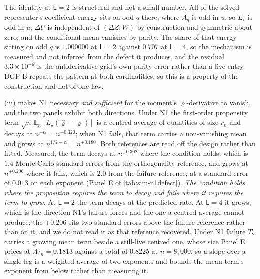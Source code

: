 \documentclass[
  12pt]{article}
\newcommand{\1}[1]{\mathds{1}\left[#1\right]}
\theoremstyle{plain}
\theoremstyle{definition}
\theoremstyle{definition}
\theoremstyle{remark}
\begin{document}
The identity at $\mathsf L=2$ is structural and not a small number. All of the
solved representer's coefficient energy sits on odd $q$ there, where $A_q$ is odd
in $u$, so $L_\star$ is odd in $u$; $\Delta U$ is independent of $(\Delta Z,W)$
by construction and symmetric about zero; and the conditional mean vanishes by
parity. The share of that energy sitting on odd $q$ is $1.000000$ at
$\mathsf L=2$ against $0.707$ at $\mathsf L=4$, so the mechanism is measured and
not inferred from the defect it produces, and the residual $3.3\times10^{-6}$ is
the antiderivative grid's own parity error rather than a live entry. DGP-B
repeats the pattern at both cardinalities, so this is a property of the
construction and not of one law.

(iii) makes N1 necessary \emph{and sufficient} for the moment's
$\varrho$-derivative to vanish, and the two panels exhibit both directions. Under
N1 the first-order propensity term
$\sqrt n\,\mathbb E_n[L_\star(\hat\varrho-\varrho)]$ is a centred average of
quantities of size $r_n$ and decays at $n^{-\alpha}=n^{-0.320}$; when N1 fails,
that term carries a non-vanishing mean and grows at $n^{1/2-\alpha}=n^{+0.180}$.
Both references are read off the design rather than fitted. Measured, the term
decays at $n^{-0.302}$ where the condition holds, which is $1.4$ Monte Carlo
standard errors from the orthogonality reference, and grows at $n^{+0.206}$ where
it fails, which is $2.0$ from the failure reference, at a standard error of
$0.013$ on each exponent (Panel E of \cref{tab:sim-n1defect}). \emph{The condition
holds where the proposition requires the term to decay and fails where it
requires the term to grow.} At $\mathsf L=2$ the term decays at the predicted
rate. At $\mathsf L=4$ it grows, which is the direction N1's failure forces and
the one a centred average cannot produce; the $+0.206$ sits two standard errors
above the failure reference rather than on it, and we do not read it as that
reference recovered. Under N1 failure $T_2$ carries a growing mean term beside a
still-live centred one, whose size Panel E prices at $\Lambda\tau_n=0.1813$
against a total of $0.8225$ at $n=8{,}000$, so a slope over a single leg is a
weighted average of two exponents and bounds the mean term's exponent from below
rather than measuring it.
\end{document}
